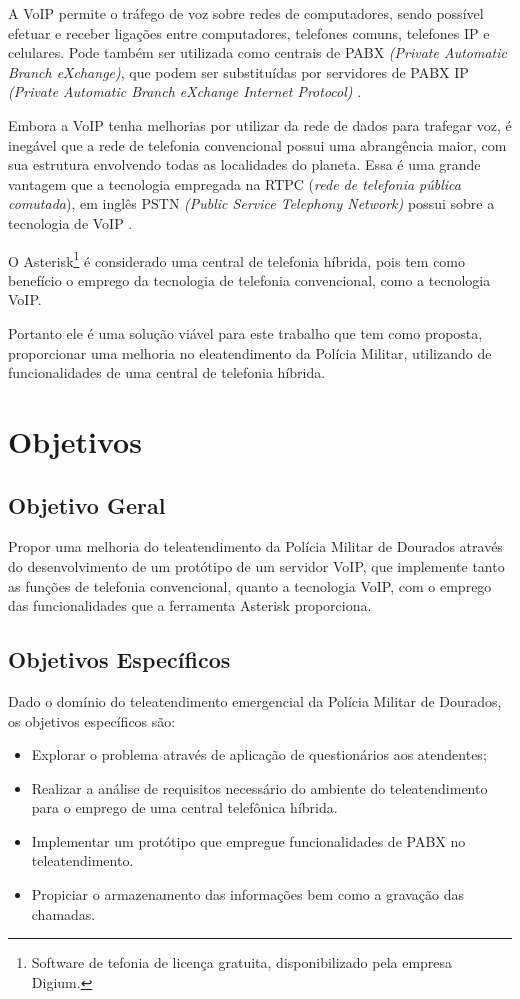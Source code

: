 A VoIP permite o tráfego de voz sobre redes de computadores, sendo possível efetuar e receber ligações entre computadores, telefones comuns, telefones IP e celulares. Pode também ser utilizada como centrais de PABX \textit{(Private Automatic Branch eXchange)}, que podem ser substituídas por servidores de PABX IP \textit{(Private Automatic Branch eXchange Internet Protocol)} \cite{glauciadasilvaribeiro2011}.

Embora a VoIP tenha melhorias por utilizar da rede de dados para trafegar voz, é inegável que a rede de telefonia convencional possui uma abrangência maior, com sua estrutura envolvendo todas as localidades do planeta. Essa é uma grande vantagem que a tecnologia empregada na RTPC (\textit{rede de telefonia pública comutada}), em inglês PSTN \textit{(Public Service Telephony Network)} possui sobre a tecnologia de VoIP \cite{theodorewallingford2005}.

O Asterisk\footnote{Software de tefonia de licença gratuita, disponibilizado pela empresa Digium.} é considerado uma central de telefonia híbrida, pois tem como benefício o emprego da tecnologia de telefonia convencional, como a tecnologia VoIP.

Portanto ele é uma solução viável para este trabalho que tem como proposta, proporcionar uma melhoria no eleatendimento da Polícia Militar, utilizando de funcionalidades de uma central de telefonia híbrida.

\section{Objetivos}
\subsection{Objetivo Geral}
Propor uma melhoria do teleatendimento da Polícia Militar de Dourados através do desenvolvimento de um protótipo de um servidor VoIP, que implemente tanto as funções de telefonia convencional, quanto a tecnologia VoIP, com o emprego das funcionalidades que a ferramenta Asterisk proporciona.

\subsection{Objetivos Específicos}
Dado o domínio do teleatendimento emergencial da Polícia Militar de Dourados, os objetivos específicos são:

\begin{itemize}
	\item Explorar o problema através de aplicação de questionários aos atendentes;
	\item Realizar a análise de requisitos necessário do ambiente do teleatendimento para o emprego de uma central telefônica híbrida.
	\item Implementar um protótipo que empregue funcionalidades de PABX no teleatendimento.
	\item Propiciar o armazenamento das informações bem como a gravação das chamadas.
\end{itemize}

